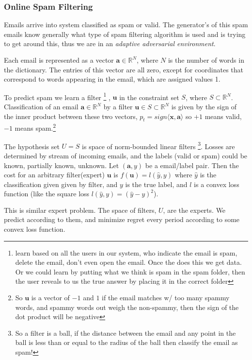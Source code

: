 \documentclass[11pt]{article}
\theoremstyle{quest}
\newcommand{\R}{\mathbb{R}}
\begin{document}
\subsubsection{Online Spam Filtering}

Emails arrive into system classified as spam or valid. The generator's of this spam emails know generally what type of spam filtering algorithm is used and is trying to get around this, thus we are in an \textit{adaptive adversarial environment}.  

Each email is represented as a vector $\mathbf{a}\in \R^N$, where $N$ is the number of words in the dictionary. The entries of this vector are all zero, except for coordinates that correspond to words appearing in the email, which are assigned values 1.

To predict spam we learn a filter%
%
%
\footnote{learn based on all the users in our system, who indicate the email is spam, delete the email, don't even open the email. Once the does this we get data. Or we could learn by putting what we think is spam in the spam folder, then the user reveals to us the true answer by placing it in the correct folder}
%
%
, $\mathbf{u}$ in the constraint set $S$, where $S\subset \R^N$. Classification of an email $\mathbf{a}\in \R^N$ by a filter $\mathbf{u}\in S\subset \R^N$ is given by the sign of the inner product between these two vectors, $p_t = sign \langle \mathbf{x}, \mathbf{a} \rangle $ so $+1$ means valid, $-1 $ means spam.\footnote{So $\mathbf{u}$ is a vector of $-1$ and $1$ if the email matches w/ too many spammy words, and spammy words out weigh the non-spammy, then the sign of the dot product will be negative}
%
%
%
%

The hypothesis set $U=S$ is space of norm-bounded linear filters%
%
\footnote{So a filter is a ball, if the distance between the email and any point in the ball is less than or equal to the radius of the ball then classify the email as spam!}.
%
Losses are determined by stream of incoming emails, and the labels (valid or spam) could be known, partially known, unknown.  Let $(\mathbf{a},y)$ be a email/label pair. Then the cost for an arbitrary filter(expert) $\mathbf{u}$ is  $f(\mathbf{u})=l(\hat{y},y)$ where $\hat{y}$ is the classification given given by filter, and $y$ is the true label, and $l$ is a convex loss function (like the square loss $l(\hat{y},y) = (\hat{y}-y)^2$). 

This is similar expert problem. The space of filters, $U$, are the experts. We predict according to them, and minimize regret every period according to some convex loss function. 
\end{document}
